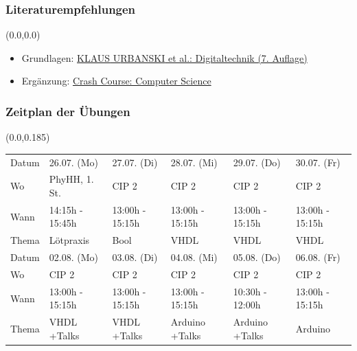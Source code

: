 \documentclass[aspectratio=169, 14pt]{beamer}
\begin{document}
\begin{frame}
    \frametitle{Literaturempfehlungen}
    \begin{textblock*}{2\paperwidth}(0.0\paperwidth,0.0\paperheight)
        \vspace*{2.0cm}
        \begin{itemize}
            \setlength\itemsep{16pt}
            \item Grundlagen: \textcolor{uniblau}{\href{https://link.springer.com/book/10.1007/978-3-662-49731-9}{K{\fontsize{10}{10}\selectfont LAUS} U{\fontsize{10}{10}\selectfont RBANSKI} et al.: Digitaltechnik (7. Auflage)}}
            \item Ergänzung: \textcolor{uniblau}{\href{https://www.youtube.com/playlist?list=PLH2l6uzC4UEW0s7-KewFLBC1D0l6XRfye}{Crash Course: Computer Science}}
        \end{itemize}
    \end{textblock*}
    \framenumber
\end{frame}


\begin{frame}
    \frametitle{Zeitplan der Übungen}
    \begin{textblock*}{\paperwidth}(0.0\paperwidth,0.185\paperheight)
        {\fontsize{12}{10}\selectfont
        \begin{tabular}{L{0.10\paperwidth}|C{0.15\paperwidth}C{0.15\paperwidth}C{0.15\paperwidth}C{0.15\paperwidth}C{0.15\paperwidth}}
        \toprule
        \toprule
        Datum  & 26.07. (Mo)       & 27.07. (Di)          & 28.07. (Mi)        & 29.07. (Do)        & 30.07. (Fr) \\[2.0 mm]
        Wo     & PhyHH, 1. St.     & CIP 2                & CIP 2              & CIP 2              & CIP 2 \\[2.0 mm]
        Wann   & 14:15h - 15:45h   & 13:00h - 15:15h      & 13:00h - 15:15h    & 13:00h - 15:15h    & 13:00h - 15:15h \\[2.0 mm]
        Thema  & Lötpraxis         & Bool                 & VHDL               & VHDL               & VHDL \\
        \midrule
        \midrule
        Datum  & 02.08. (Mo)       & 03.08. (Di)          & 04.08. (Mi)        & 05.08. (Do)        & 06.08. (Fr) \\[2.0 mm]
        Wo     & CIP 2             & CIP 2                & CIP 2              & CIP 2              & CIP 2 \\[2.0 mm]
        Wann   & 13:00h - 15:15h   & 13:00h - 15:15h      & 13:00h - 15:15h    & 10:30h - 12:00h    & 13:00h - 15:15h \\[2.0 mm]
        Thema  & VHDL +Talks       & VHDL +Talks          & Arduino +Talks     & Arduino +Talks     & Arduino \\
        \bottomrule
        \bottomrule
        \end{tabular}
        }
    \end{textblock*}
    \framenumber
\end{frame}
\end{document}
